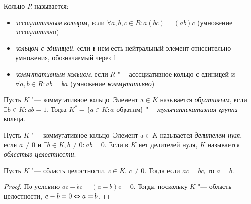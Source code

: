 \begin{definition}
	Кольцо $R$ называется:
	\begin{itemize}
		\item \textit{ассоциативным кольцом}, если $\forall a, b, c \in R: a(bc) = (ab)c$ (умножение \textit{ассоциативно})
		\item \textit{кольцом с единицей}, если в нем есть нейтральный элемент относительно умножения, обозначаемый через 1
		\item \textit{коммутативным кольцом}, если $R$ "--- ассоциативное кольцо с единицей и $\forall a, b \in R: ab = ba$ (умножение \textit{коммутативно})
	\end{itemize}
\end{definition}

\begin{definition}
	Пусть $K$ "--- коммутативное кольцо. Элемент $a \in K$ называется \textit{обратимым}, если $\exists b \in K: ab = 1$. Тогда $K^* = \{a \in K: a \text{ обратим}\}$ "--- \textit{мультипликативная группа} кольца.
\end{definition}

\begin{definition}
	Пусть $K$ "--- коммутативное кольцо. Элемент $a \in K$ называется \textit{делителем нуля}, если $a \ne 0$ и $\exists b \in K, b \ne 0: ab = 0$. Если в $K$ нет делителей нуля, $K$ называется \textit{областью целостности}.
\end{definition}

\begin{proposition}
	Пусть $K$ "--- область целостности, $c \in K$, $c \ne 0$. Тогда если $ac = bc$, то $a = b$.
\end{proposition}

\begin{proof}
	По условию $ac - bc = (a - b)c = 0$. Тогда, поскольку $K$ "--- область целостности, $a - b = 0 \Leftrightarrow a = b$.
\end{proof}